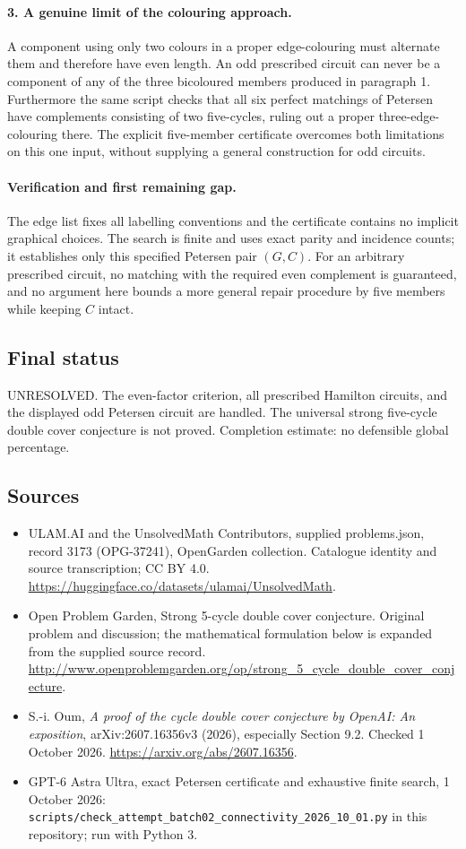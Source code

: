 \documentclass[11pt,a4paper]{article}
\begin{document}
\paragraph{3. A genuine limit of the colouring approach.}
A component using only two colours in a proper edge-colouring must
alternate them and therefore have even length. An odd prescribed
circuit can never be a component of any of the three bicoloured
members produced in paragraph 1. Furthermore the same script checks
that all six perfect matchings of Petersen have complements consisting
of two five-cycles, ruling out a proper three-edge-colouring there.
The explicit five-member certificate overcomes both limitations on this
one input, without supplying a general construction for odd circuits.

\paragraph{Verification and first remaining gap.}
The edge list fixes all labelling conventions and the certificate
contains no implicit graphical choices. The search is finite and
uses exact parity and incidence counts; it establishes only this
specified Petersen pair $(G,C)$. For an arbitrary prescribed circuit,
no matching with the required even complement is guaranteed, and
no argument here bounds a more general repair procedure by five
members while keeping $C$ intact.

\subsection{Final status}
UNRESOLVED. The even-factor criterion, all prescribed Hamilton circuits,
and the displayed odd Petersen circuit are handled. The universal
strong five-cycle double cover conjecture is not proved. Completion
estimate: no defensible global percentage.

\subsection{Sources}
\begin{itemize}
\item[S1] ULAM.AI and the UnsolvedMath Contributors, supplied problems.json, record 3173 (OPG-37241), OpenGarden collection. Catalogue identity and source transcription; CC BY 4.0.
\url{https://huggingface.co/datasets/ulamai/UnsolvedMath}.
\item[S2] Open Problem Garden, Strong 5-cycle double cover conjecture. Original problem and discussion; the mathematical formulation below is expanded from the supplied source record.
\url{http://www.openproblemgarden.org/op/strong_5_cycle_double_cover_conjecture}.
\item[S3] S.-i. Oum, \emph{A proof of the cycle double cover conjecture by OpenAI: An exposition}, arXiv:2607.16356v3 (2026), especially Section 9.2. Checked 1 October 2026.
\url{https://arxiv.org/abs/2607.16356}.
\item[S4] GPT-6 Astra Ultra, exact Petersen certificate and exhaustive finite search, 1 October 2026: \texttt{scripts/check\_attempt\_batch02\_connectivity\_2026\_10\_01.py} in this repository; run with Python 3.
\end{itemize}
\end{document}
